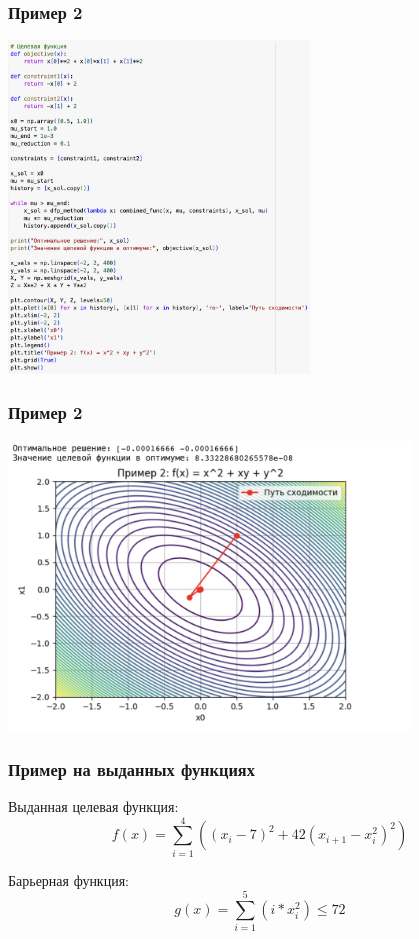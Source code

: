 \documentclass[12pt,pdf,hyperref={unicode}]{beamer}
\begin{document}
\begin{frame}
\frametitle{Пример 2}
\begin{center}
    \includegraphics[width=0.6\textwidth]{image7.png}
\end{center}
\end{frame}

\begin{frame}
\frametitle{Пример 2}
\begin{center}
    \includegraphics[width=0.8\textwidth]{image8.png}
\end{center}
\end{frame}

\begin{frame}
\frametitle{Пример на выданных функциях}
Выданная целевая функция: \\
\[
f(x) = \sum_{i=1}^4((x_i - 7)^2 + 42(x_{i+1} - x_i^2)^2)
\]

Барьерная функция: \\
\[
g(x) = \sum_{i=1}^5(i*x_i^2) \leqslant 72
\]

\end{frame}
\end{document}
